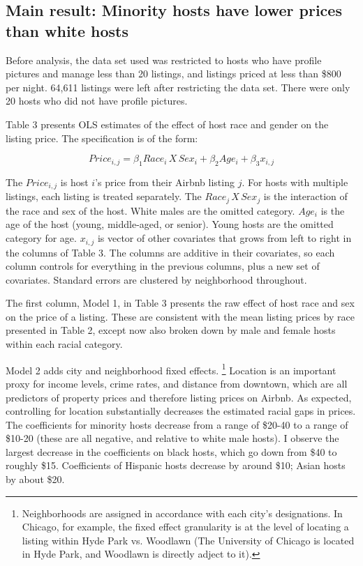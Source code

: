 \subsection{Main result: Minority hosts have lower prices than white hosts} 

Before analysis, the data set used was restricted to hosts who have profile pictures and manage less than 20 listings, and listings priced at less than \$800 per night. 64,611 listings were left after restricting the data set. There were only 20 hosts who did not have profile pictures.

Table 3 presents OLS estimates of the effect of host race and gender on the listing price. The specification is of the form: 

\[ Price_{i,j} = \beta_1 Race_{i}\,X \,Sex_i + \beta_2 Age_i + \beta_3 x_{i,j}\]

The $Price_{i,j}$ is host $i$'s price from their Airbnb listing $j$. For hosts with multiple listings, each listing is treated separately. The $Race_{j}\,X \,Sex_j$ is the interaction of the race and sex of the host. White males are the omitted category. $Age_i$ is the age of the host (young, middle-aged, or senior). Young hosts are the omitted category for age. $x_{i,j}$ is vector of other covariates that grows from left to right in the columns of Table 3. The columns are additive in their covariates, so each column controls for everything in the previous columns, plus a new set of covariates. Standard errors are clustered by neighborhood throughout.

The first column, Model 1, in Table 3 presents the raw effect of host race and sex on the price of a listing. These are consistent with the mean listing prices by race presented in Table 2, except now also broken down by male and female hosts within each racial category.

Model 2 adds city and neighborhood fixed effects.%
	\footnote{Neighborhoods are assigned in accordance with each city's designations. In Chicago, for example, the fixed effect granularity is at the level of locating a listing within Hyde Park vs. Woodlawn (The University of Chicago is located in Hyde Park, and Woodlawn is directly adject to it).}
Location is an important proxy for income levels, crime rates, and distance from downtown, which are all predictors of property prices and therefore listing prices on Airbnb. As expected, controlling for location substantially decreases the estimated racial gaps in prices. The coefficients for minority hosts decrease from a range of \$20-40 to a range of \$10-20 (these are all negative, and relative to white male hosts). I observe the largest decrease in the coefficients on black hosts, which go down from \$40 to roughly \$15. Coefficients of Hispanic hosts decrease by around \$10; Asian hosts by about \$20. 

